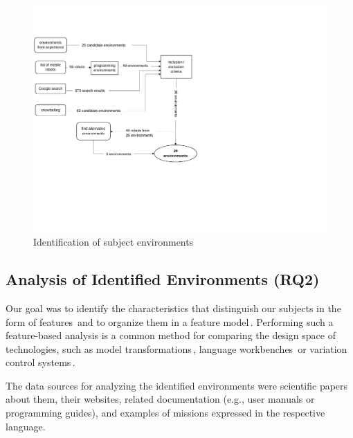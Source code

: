     \begin{figure}[t]
      \centering
      \includegraphics[width=\columnwidth]{fig/selection.pdf}
      \caption{Identification of subject environments}
      \label{fig:selection}
			\vspace{-.4cm}
    \end{figure}
    

\subsection{Analysis of Identified Environments (RQ2)}
\label{sec:extr}
Our goal was to identify the characteristics that distinguish our subjects in the form of features\,\cite{berger2015feature} and to organize them in a feature model\,\cite{kang.ea:1990:foda,damir2019principles}. Performing such a feature-based analysis is a common method for comparing the design space of technologies, such as model transformations\,\cite{transformationSurvey}, language workbenches\,\cite{erdweg2013languageworkbenches} or variation control systems\,\cite{linsbauer2017gpce}.

The data sources for analyzing the identified environments were scientific papers about them, their websites, related documentation (e.g., user manuals or programming guides), and examples of missions expressed in the respective language.


